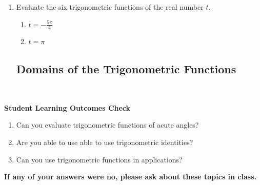 \begin{enumerate}
\begin{enumerate}
\end{enumerate}

\item Evaluate the six trigonometric functions of the real number $t$.
\begin{enumerate}

\item $\displaystyle t=-\frac{5\pi}{4}$\vfill
\item $\displaystyle t=\pi$\vfill

\end{enumerate}


\newpage

\subsection{Domains of the Trigonometric Functions} ~

\vfill



\end{enumerate}





\noindent \textbf{Student Learning Outcomes Check}

\begin{enumerate}
\item Can you evaluate trigonometric functions of acute angles?
\item Are you able to use able to use trigonometric identities?
\item Can you use trigonometric functions in applications?
\end{enumerate}

\noindent \textbf{If any of your answers were no, please ask about these topics in class.}

